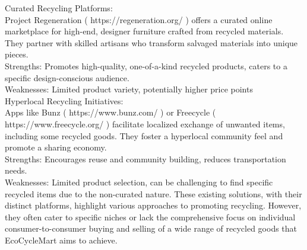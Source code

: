 \documentclass[12pt, a4paper, oneside]{article}
\begin{document}
Curated Recycling Platforms:\\
 Project Regeneration ( https://regeneration.org/ ) offers a curated online marketplace for high-end, designer furniture crafted from recycled materials. They partner with skilled artisans who transform salvaged materials into unique pieces.\\
Strengths: Promotes high-quality, one-of-a-kind recycled products, caters to a specific design-conscious audience.\\
Weaknesses: Limited product variety, potentially higher price points\\

Hyperlocal Recycling Initiatives:\\
 Apps like Bunz ( https://www.bunz.com/ ) or Freecycle ( https://www.freecycle.org/ ) facilitate localized exchange of unwanted items, including some recycled goods. They foster a hyperlocal community feel and promote a sharing economy.\\
Strengths: Encourages reuse and community building, reduces transportation needs.\\
Weaknesses: Limited product selection, can be challenging to find specific recycled items due to the non-curated nature. 
These existing solutions, with their distinct platforms, highlight various approaches to promoting recycling. However, they often cater to specific niches or lack the comprehensive focus on individual consumer-to-consumer buying and selling of a wide range of recycled goods that EcoCycleMart aims to achieve.

%
\end{document}
